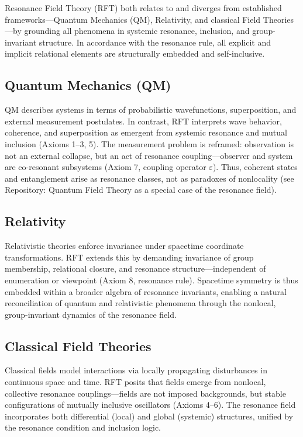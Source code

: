 \documentclass[12pt]{article}
\begin{document}
Resonance Field Theory (RFT) both relates to and diverges from established frameworks—Quantum Mechanics (QM), Relativity, and classical Field Theories—by grounding all phenomena in systemic resonance, inclusion, and group-invariant structure. In accordance with the resonance rule, all explicit and implicit relational elements are structurally embedded and self-inclusive.

\subsection{Quantum Mechanics (QM)}
QM describes systems in terms of probabilistic wavefunctions, superposition, and external measurement postulates. In contrast, RFT interprets wave behavior, coherence, and superposition as emergent from systemic resonance and mutual inclusion (Axioms 1–3, 5). The measurement problem is reframed: observation is not an external collapse, but an act of resonance coupling—observer and system are co-resonant subsystems (Axiom 7, coupling operator $\varepsilon$). Thus, coherent states and entanglement arise as resonance classes, not as paradoxes of nonlocality (see Repository: Quantum Field Theory as a special case of the resonance field).

\subsection{Relativity}
Relativistic theories enforce invariance under spacetime coordinate transformations. RFT extends this by demanding invariance of group membership, relational closure, and resonance structure—independent of enumeration or viewpoint (Axiom 8, resonance rule). Spacetime symmetry is thus embedded within a broader algebra of resonance invariants, enabling a natural reconciliation of quantum and relativistic phenomena through the nonlocal, group-invariant dynamics of the resonance field.

\subsection{Classical Field Theories}
Classical fields model interactions via locally propagating disturbances in continuous space and time. RFT posits that fields emerge from nonlocal, collective resonance couplings—fields are not imposed backgrounds, but stable configurations of mutually inclusive oscillators (Axioms 4–6). The resonance field incorporates both differential (local) and global (systemic) structures, unified by the resonance condition and inclusion logic.
\end{document}
